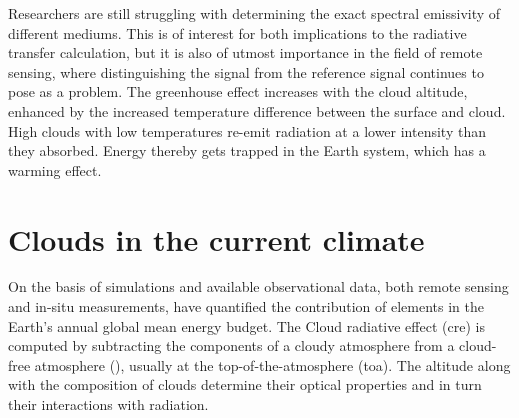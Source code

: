 Researchers are still struggling with determining the exact spectral emissivity of different mediums. This is of interest for both implications to the radiative transfer calculation, but it is also of utmost importance in the field of remote sensing, where distinguishing the signal from the reference signal continues to pose as a problem.
The greenhouse effect increases with the cloud altitude, enhanced by the increased temperature difference between the surface and cloud. High clouds with low temperatures re-emit radiation at a lower intensity than they absorbed. Energy thereby gets trapped in the Earth system, which has a warming effect. 
\section{Clouds in the current climate} \label{sec:intro_cloud_current_climate}
On the basis of simulations and available observational data, both remote sensing and in-situ measurements,  have quantified the contribution of elements in the Earth's annual global mean energy budget. The Cloud radiative effect (\acrshort{cre}) is computed by subtracting the components of a cloudy atmosphere from a cloud-free atmosphere (\cite{RAMANATHAN1989}), usually at the top-of-the-atmosphere (\acrshort{toa}). The altitude along with the composition of clouds determine their optical properties and in turn their interactions with radiation.

